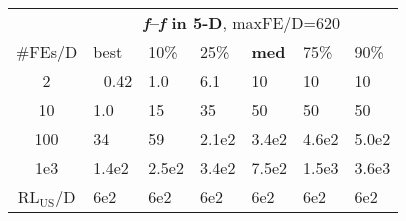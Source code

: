\begin{tabular}{c|llllll}
 & \multicolumn{6}{|c}{\textbf{\textit{f}\raisebox{-0.35ex}{1}--\textit{f}\raisebox{-0.35ex}{24} in 5-D}, maxFE/D=620}\\
\#FEs/D & best & 10\% & 25\% & \textbf{med} & 75\% & 90\%\\
2 & ~\,0.42 & \hspace*{1ex}1.0 & \hspace*{1ex}6.1 & 10 & 10 & 10\\
10 & \hspace*{1ex}1.0 & 15 & 35 & 50 & 50 & 50\\
100 & 34 & 59 & 2.1e2 & 3.4e2 & 4.6e2 & 5.0e2\\
1e3 & 1.4e2 & 2.5e2 & 3.4e2 & 7.5e2 & 1.5e3 & 3.6e3\\
$\text{RL}_{\text{US}}$/D & 6e2 & 6e2 & 6e2 & 6e2 & 6e2 & 6e2
\end{tabular}
